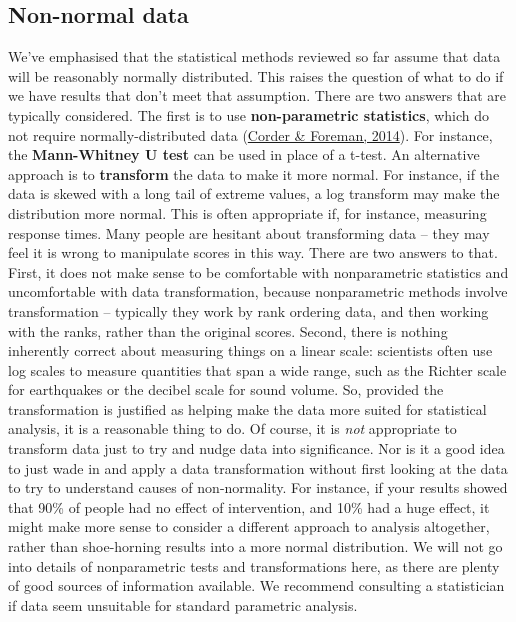 \documentclass{krantz}
\begin{document}
\hypertarget{non-normal-data}{%
\subsection{Non-normal data}\label{non-normal-data}}

We've emphasised that the statistical methods reviewed so far assume that data will be reasonably normally distributed. This raises the question of what to do if we have results that don't meet that assumption. There are two answers that are typically considered. The first is to use \textbf{non-parametric statistics}, which do not require normally-distributed data  (\protect\hyperlink{ref-corder2014}{Corder \& Foreman, 2014}). For instance, the \textbf{Mann-Whitney U test} can be used in place of a t-test. An alternative approach is to \textbf{transform} the data to make it more normal. For instance, if the data is skewed with a long tail of extreme values, a log transform may make the distribution more normal. This is often appropriate if, for instance, measuring response times. Many people are hesitant about transforming data -- they may feel it is wrong to manipulate scores in this way. There are two answers to that. First, it does not make sense to be comfortable with nonparametric statistics and uncomfortable with data transformation, because nonparametric methods involve transformation -- typically they work by rank ordering data, and then working with the ranks, rather than the original scores. Second, there is nothing inherently correct about measuring things on a linear scale: scientists often use log scales to measure quantities that span a wide range, such as the Richter scale for earthquakes or the decibel scale for sound volume. So, provided the transformation is justified as helping make the data more suited for statistical analysis, it is a reasonable thing to do. Of course, it is \emph{not} appropriate to transform data just to try and nudge data into significance. Nor is it a good idea to just wade in and apply a data transformation without first looking at the data to try to understand causes of non-normality. For instance, if your results showed that 90\% of people had no effect of intervention, and 10\% had a huge effect, it might make more sense to consider a different approach to analysis altogether, rather than shoe-horning results into a more normal distribution. We will not go into details of nonparametric tests and transformations here, as there are plenty of good sources of information available. We recommend consulting a statistician if data seem unsuitable for standard parametric analysis.
\end{document}
